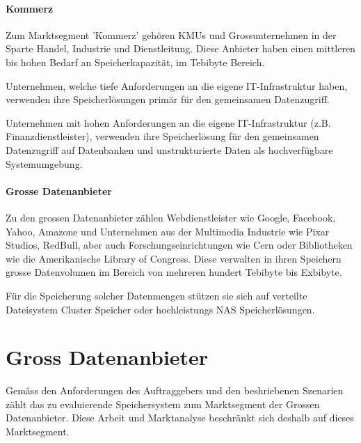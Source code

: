 \paragraph*{Kommerz}
Zum Marktsegment 'Kommerz' gehören KMUs und Grossunternehmen in der Sparte Handel, Industrie und Dienstleitung. Diese Anbieter haben einen mittleren bis hohen Bedarf an Speicherkapazität, im Tebibyte Bereich. 

Unternehmen, welche tiefe Anforderungen an die eigene IT-Infrastruktur haben, verwenden ihre Speicherlösungen primär für den gemeinsamen Datenzugriff. 


Unternehmen mit hohen Anforderungen an die eigene IT-Infrastruktur (z.B. Finanzdienstleister), verwenden ihre Speicherlösung für den gemeinsamen Datenzugriff auf Datenbanken und unstrukturierte Daten als hochverfügbare Systemumgebung.


\paragraph*{Grosse Datenanbieter}
Zu den grossen Datenanbieter zählen Webdienstleister wie Google, Facebook, Yahoo, Amazone und Unternehmen aus der Multimedia Industrie wie Pixar Studios, RedBull, aber auch Forschungseinrichtungen wie Cern oder Bibliotheken wie die Amerikanische Library of Congress.
Diese verwalten in ihren Speichern grosse Datenvolumen im Bereich von mehreren hundert Tebibyte bis Exbibyte. 

Für die Speicherung solcher Datenmengen stützen sie sich auf verteilte Dateisystem Cluster Speicher oder hochleistungs NAS Speicherlösungen. 

\section{Gross Datenanbieter}
Gemäss den Anforderungen des Auftraggebers und den beshriebenen Szenarien zählt das zu evaluierende Speichersystem zum Marktsegment der Grossen Datenanbieter. Diese Arbeit und Marktanalyse beschränkt sich deshalb auf dieses Marktsegment.

